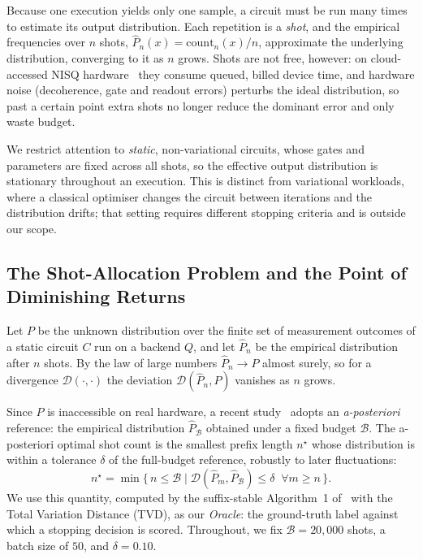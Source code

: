 \documentclass[runningheads]{llncs}
\begin{document}
Because one execution yields only one sample, a circuit must be run many times
to estimate its output distribution. Each repetition is a \emph{shot}, and the
empirical frequencies over $n$ shots, $\hat{P}_n(x)=\mathrm{count}_n(x)/n$,
approximate the underlying distribution, converging to it as $n$ grows. Shots
are not free, however: on cloud-accessed NISQ hardware~\cite{preskill2018nisq} they consume queued, billed device time,
and hardware noise (decoherence, gate and readout errors) perturbs the ideal
distribution, so past a certain point extra shots no longer reduce the dominant
error and only waste budget.

We restrict attention to \emph{static}, non-variational circuits, whose gates
and parameters are fixed across all shots, so the effective output distribution
is stationary throughout an execution. This is distinct from variational
workloads, where a classical optimiser changes the circuit between iterations
and the distribution drifts; that setting requires different stopping criteria
and is outside our scope.

\subsection{The Shot-Allocation Problem and the Point of Diminishing Returns}

Let $P$ be the unknown distribution over the finite set of measurement outcomes
of a static circuit $C$ run on a backend $Q$, and let $\hat{P}_n$ be the
empirical distribution after $n$ shots. By the law of large numbers
$\hat{P}_n \to P$ almost surely, so for a divergence $\mathcal{D}(\cdot,\cdot)$
the deviation $\mathcal{D}(\hat{P}_n, P)$ vanishes as $n$ grows.

Since $P$ is inaccessible on real hardware, a recent
study~\cite{bisicchia2026shots} adopts an \emph{a-posteriori} reference: the
empirical distribution $\hat{P}_{\mathcal{B}}$ obtained under a fixed budget
$\mathcal{B}$. The a-posteriori optimal shot count is the smallest prefix length
$n^{\star}$ whose distribution is within a tolerance $\delta$ of the full-budget
reference, robustly to later fluctuations:
\begin{equation}
  n^{\star} = \min\bigl\{\, n \le \mathcal{B} \;\big|\;
  \mathcal{D}(\hat{P}_m, \hat{P}_{\mathcal{B}}) \le \delta \;\;\forall m \ge n \,\bigr\}.
  \label{eq:oracle}
\end{equation}
We use this quantity, computed by the suffix-stable Algorithm~1
of~\cite{bisicchia2026shots} with the Total Variation Distance (TVD), as our
\emph{Oracle}: the ground-truth label against which a stopping decision is
scored. Throughout, we fix $\mathcal{B}=20{,}000$ shots, a batch size of $50$,
and $\delta=0.10$.
\end{document}
